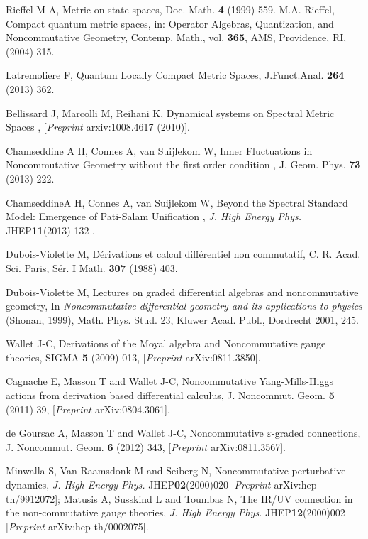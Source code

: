 \documentclass[a4paper,11pt,twoside]{article}
\numberwithin{equation}{section}
\theoremstyle{nonumberplain}
\begin{document}
\begin{thebibliography}{50}
 Rieffel M A, {{Metric on state spaces}}, Doc. Math. {\bf{4}} (1999) 559. M.A. Rieffel, {{Compact quantum metric spaces}}, in: Operator Algebras, Quantization, and Noncommutative Geometry, Contemp. Math., vol. {\bf{365}}, AMS, Providence, RI, (2004) 315.

 Latremoliere F, {{Quantum Locally Compact Metric Spaces}}, J.Funct.Anal. {\bf{264}} (2013) 362. 

 Bellissard J, Marcolli M, Reihani K, {{Dynamical systems on Spectral Metric Spaces }}, [{\it{Preprint }} arxiv:1008.4617 (2010)].

 Chamseddine A H, Connes A, van Suijlekom W, {{Inner Fluctuations in Noncommutative Geometry without the first order condition }}, J. Geom. Phys. {\bf{73}} (2013) 222.

 ChamseddineA H, Connes A, van Suijlekom W, {{Beyond the Spectral Standard Model: Emergence of Pati-Salam Unification }}, {\it{J. High Energy Phys.}} JHEP{\bf{11}}(2013) 132 .

 Dubois-Violette M, {{D\'erivations et calcul diff\'erentiel non commutatif}}, C. R. Acad. Sci. Paris, S\'er. I Math. {\bf{307}} (1988) 403.

 Dubois-Violette M, Lectures on graded differential algebras and noncommutative geometry, In {\it{Noncommutative differential geometry and its applications to physics}} (Shonan, 1999), Math. Phys. Stud. 23, Kluwer Acad. Publ., Dordrecht 2001, 245.

 Wallet J-C, {{Derivations of the Moyal algebra and Noncommutative gauge theories}}, SIGMA {\bf{5}} (2009) 013, [{\it{Preprint }} arXiv:0811.3850].

Cagnache E, Masson T and Wallet J-C, {{Noncommutative Yang-Mills-Higgs actions from derivation based differential calculus}}, J. Noncommut. Geom. {\bf{5}} (2011) 39, [{\it{Preprint }} arXiv:0804.3061].

de Goursac A, Masson T and Wallet J-C, {{Noncommutative $\varepsilon$-graded connections}}, J. Noncommut. Geom. {\bf{6}} (2012) 343, [{\it{Preprint }} arXiv:0811.3567].

 Minwalla S, Van Raamsdonk M and Seiberg N, {{ Noncommutative perturbative dynamics}}, {\it{J. High Energy Phys.}} JHEP{\bf 02}(2000)020 [{\it{Preprint }} arXiv:hep-th/9912072]; Matusis A, Susskind L and Toumbas N, {{ The IR/UV connection in the non-commutative gauge theories}}, {\it{J. High Energy Phys.}} JHEP{\bf 12}(2000)002 [{\it{Preprint }} arXiv:hep-th/0002075].



\end{thebibliography}
\end{document}
